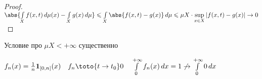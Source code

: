 \begin{proof}\thmslashn
	
	$\abs{\int\limits_{X} f(x, t) \,d\mu (x) - \int\limits_{X} g(x)\,d\mu} \leqslant \int\limits_{X} \abs{f(x, t) - g(x)}\,d\mu \leqslant \mu X \cdot \sup\limits_{x\in X} |f(x, t) - g(x)| \to 0$	
	
\end{proof}

\begin{remark}\thmslashn
	
	Условие про $\mu X < +\infty$ существенно
	
	$f_n(x) = \frac{1}{n} \mathbf{1}_{[0, n]}(x) \quad f_n \toto{t\to t_0} 0 \quad \int\limits_{0}^{+\infty} f_n(x) \,dx = 1 \not \to \int\limits_{0}^{+\infty} 0 \,dx$ 
	
\end{remark}
